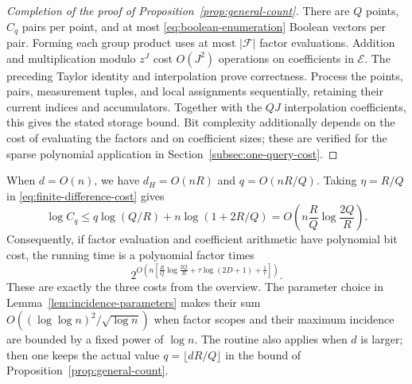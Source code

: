 \begin{proof}[Completion of the proof of Proposition~\ref{prop:general-count}]
There are $Q$ points, $C_q$ pairs per point, and at most
\eqref{eq:boolean-enumeration} Boolean vectors per pair.
Forming each group product uses at most $|\mathcal F|$ factor evaluations.
Addition and multiplication modulo $z^J$ cost $O(J^2)$ operations
on coefficients in $\mathcal E$. The preceding Taylor identity
and interpolation prove correctness.
Process the points, pairs, measurement tuples, and local assignments
sequentially, retaining their current indices and accumulators.
Together with the $QJ$ interpolation coefficients, this gives the
stated storage bound. Bit complexity additionally depends on the
cost of evaluating the factors and on coefficient sizes; these are
verified for the sparse polynomial application in
Section~\ref{subsec:one-query-cost}.
\end{proof}

When $d=O(n)$, we have $d_H=O(nR)$ and $q=O(nR/Q)$.
Taking $\eta=R/Q$ in \eqref{eq:finite-difference-cost} gives
\[
 \log C_q\le q\log(Q/R)+n\log(1+2R/Q)
     =O\!\left(n\frac RQ\log\frac{2Q}{R}\right).
\]
Consequently, if factor evaluation and coefficient arithmetic have
polynomial bit cost, the running time is a polynomial factor times
\begin{equation}\label{eq:three-costs}
 2^{O\left(n\left[
       \frac RQ\log\frac{2Q}{R}
       +\tau\log(2D+1)+\frac1r\right]\right)}.
\end{equation}
These are exactly the three costs from the overview. The parameter
choice in Lemma~\ref{lem:incidence-parameters} makes their sum
$O((\log\log n)^2/\sqrt{\log n})$ when factor scopes and their
maximum incidence are bounded by a fixed power of $\log n$.
The routine also applies when $d$ is larger; then one keeps the
actual value $q=\lfloor dR/Q\rfloor$ in the bound of
Proposition~\ref{prop:general-count}.


